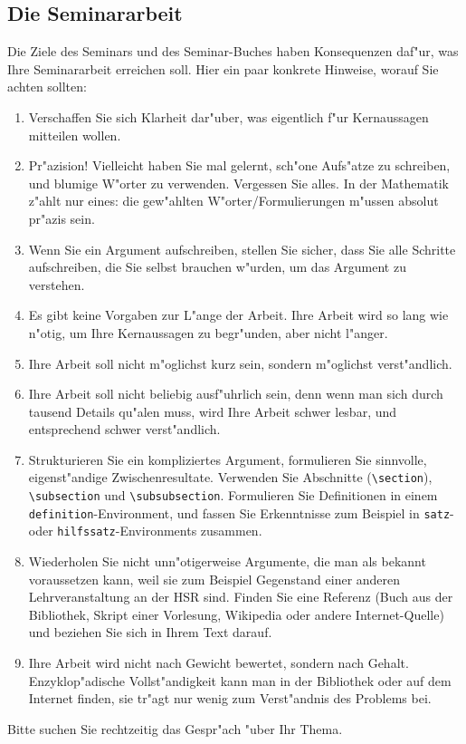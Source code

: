 \documentclass[a4paper]{article}
\begin{document}
\subsection{Die Seminararbeit}
Die Ziele des Seminars und des Seminar-Buches haben Konsequenzen daf"ur,
was Ihre Seminararbeit erreichen soll.
Hier ein paar konkrete Hinweise, worauf Sie achten sollten:
\begin{enumerate}
\item
Verschaffen Sie sich Klarheit dar"uber, was eigentlich f"ur Kernaussagen
mitteilen wollen.
\item
Pr"azision! 
Vielleicht haben Sie mal gelernt, sch"one Aufs"atze zu schreiben,
und blumige W"orter zu verwenden. Vergessen Sie alles.
In der Mathematik z"ahlt nur eines: die gew"ahlten W"orter/Formulierungen
m"ussen absolut pr"azis sein.
\item
Wenn Sie ein Argument aufschreiben, stellen Sie sicher, dass Sie alle
Schritte aufschreiben, die Sie selbst brauchen w"urden, um das 
Argument zu verstehen.
\item
Es gibt keine Vorgaben zur L"ange der Arbeit. 
Ihre Arbeit wird so lang wie n"otig, um Ihre Kernaussagen zu
begr"unden, aber nicht l"anger.
\item
Ihre Arbeit soll nicht m"oglichst kurz sein, sondern m"oglichst
verst"andlich.
\item
Ihre Arbeit soll nicht beliebig ausf"uhrlich sein, denn wenn man sich
durch tausend Details qu"alen muss, wird Ihre Arbeit schwer lesbar,
und entsprechend schwer verst"andlich.
\item 
Strukturieren Sie ein kompliziertes Argument, formulieren Sie sinnvolle,
eigenst"andige Zwischenresultate.
Verwenden Sie Abschnitte (\verb+\section+), \verb+\subsection+ und
\verb+\subsubsection+.
Formulieren Sie Definitionen in einem \verb+definition+-Environment,
und fassen Sie Erkenntnisse zum Beispiel in \verb+satz+- oder
\verb+hilfssatz+-Environments zusammen.
\item
Wiederholen Sie nicht unn"otigerweise Argumente, die man als bekannt
voraussetzen kann, weil sie zum Beispiel Gegenstand einer anderen
Lehrveranstaltung an der HSR sind.
Finden Sie eine Referenz (Buch aus der Bibliothek, Skript einer Vorlesung,
Wikipedia oder andere Internet-Quelle) und beziehen Sie sich in
Ihrem Text darauf.
\item
Ihre Arbeit wird nicht nach Gewicht bewertet, sondern nach Gehalt.
Enzyklop"adische Vollst"andigkeit kann man in der Bibliothek oder
auf dem Internet finden, sie tr"agt nur wenig zum Verst"andnis des
Problems bei.
\end{enumerate}
Bitte suchen Sie rechtzeitig das Gespr"ach "uber Ihr Thema.
\end{document}
